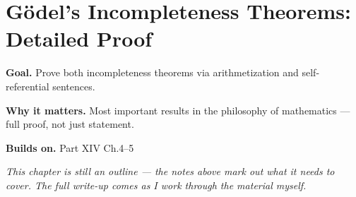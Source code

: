 \chapter{Gödel's Incompleteness Theorems: Detailed Proof}
\label{ch:14-metamathematics-06}

\begin{chapterintro}
\textbf{Goal.} Prove both incompleteness theorems via arithmetization and self-referential sentences.

\textbf{Why it matters.} Most important results in the philosophy of mathematics — full proof, not just statement.

\textbf{Builds on.} Part XIV Ch.4–5
\end{chapterintro}

\textit{This chapter is still an outline --- the notes above mark out what it needs to cover. The full write-up comes as I work through the material myself.}
